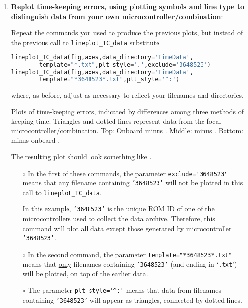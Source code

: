 \begin{enumerate}
	\item \textbf{Replot time-keeping errors, using plotting symbols and line type to distinguish data from your own microcontroller/\rtc combination}:

	Repeat the commands you used to produce the previous plots, but instead of the previous call to \lstinline{lineplot_TC_data} substitute
\begin{lstlisting}[language=Python]
lineplot_TC_data(fig,axes,data_directory='TimeData',
        template="*.txt",plt_style='.',exclude='3648523')
lineplot_TC_data(fig,axes,data_directory='TimeData', 
        template="*3648523*.txt",plt_style='^:')
\end{lstlisting}
	where, as before, adjust as necessary to reflect your filenames and directories.
	\begin{marginfigure}[-6.cm]
		\begin{center}
			\caption[Plots of time-keeping errors]{Plots of time-keeping errors, indicated by differences among three methods of keeping time. 
			Triangles and dotted lines represent data from the focal microcontroller/\rtc combination. 
			Top: Onboard \rtc minus  \rtc. Middle: \ntp minus  \rtc. Bottom: \ntp minus onboard \rtc. }
		\end{center}
	\end{marginfigure}
	The resulting plot should look something like .
	\begin{itemize}
		\item[$\circ$] In the first of these commands, the parameter \lstinline{exclude='3648523'} means that any filename containing \texttt{'3648523'} will \underline{not} be plotted in this call to \lstinline{lineplot_TC_data}. 
		
		\smallskip
		In this example, \texttt{'3648523'} is the unique ROM ID of one of the microcontrollers used to collect the data archive. 
		Therefore, this command will plot all data except those generated by microcontroller \texttt{'3648523'}.
		
		\item[$\circ$] In the second command, the parameter \lstinline{template="*3648523*.txt"} means that \underline{only} filenames containing \texttt{'3648523'} (and ending in `\texttt{.txt}') will be plotted, on top of the earlier data. 
		
		\item[$\circ$] The parameter \lstinline{plt_style='^:'} means that data from filenames containing \texttt{'3648523'} will appear as triangles, connected by dotted lines.
		

\end{itemize}
\end{enumerate}

